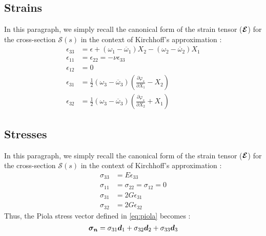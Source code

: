 \subsection{Strains}
In this paragraph, we simply recall the canonical form of the strain tensor ($\boldsymbol{\mathcal{E}}$) for the cross-section $\mathcal{S}(s)$ in the context of Kirchhoff's approximation : 
\begin{subequations}
	\begin{alignat}{1}
	\epsilon_{33} &= \epsilon + (\omega_1 - \overbar{\omega}_1) X_2 - (\omega_2 - \overbar{\omega}_2) X_1 \label{eq:strain_a}
	\\
	\epsilon_{11} &=  \epsilon_{22} = -\nu \epsilon_{33}	\label{eq:strain_b}
	\\
	\epsilon_{12} &= 0 \label{eq:strain_c}
	\\
	\epsilon_{31} &= \tfrac{1}{2}(\omega_3 - \overbar{\omega}_3)\left(\frac{\partial \varphi_s}{\partial {X_1}} - X_2 \right) \label{eq:strain_d}
	\\
	\epsilon_{32} &= \tfrac{1}{2}(\omega_3 - \overbar{\omega}_3)\left(\frac{\partial \varphi_s}{\partial {X_2}} + X_1 \right) \label{eq:strain_e}
	\end{alignat}
\end{subequations}

\subsection{Stresses}
In this paragraph, we simply recall the canonical form of the strain tensor ($\boldsymbol{\mathcal{E}}$) for the cross-section $\mathcal{S}(s)$ in the context of Kirchhoff's approximation : 
\begin{subequations}
	\begin{alignat}{1}
	\sigma_{33} &= E \epsilon_{33} \label{eq:stress_a}
	\\
	\sigma_{11} &=  \sigma_{22} = \sigma_{12} = 0 \label{eq:stress_b}
	\\
	\sigma_{31} &= 2G \epsilon_{31}	\label{eq:stress_c}
	\\
	\sigma_{32} &= 2G \epsilon_{32}	\label{eq:stress_d}
	\end{alignat}
\end{subequations}
Thus, the Piola stress vector defined in \cref{eq:piola} becomes :
\begin{equation}
	\boldsymbol{\sigma_n} = \sigma_{31}\boldsymbol{d}_1 + \sigma_{32}\boldsymbol{d}_2 + \sigma_{33}\boldsymbol{d}_3 \label{eq:piola2}
\end{equation}

